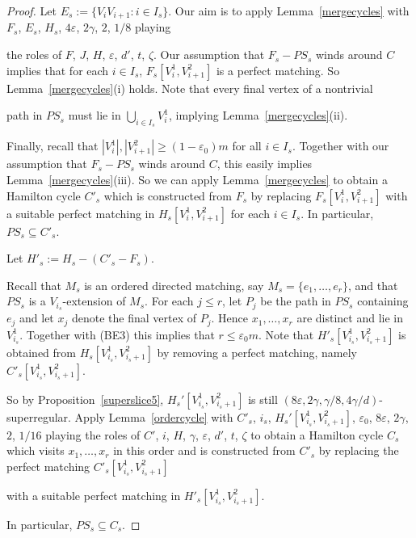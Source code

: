 \documentclass{memo-l}
\def\COMMENT#1{}
\def\eps{\varepsilon}
\numberwithin{section}{chapter}
\numberwithin{equation}{section}
\numberwithin{firstthm}{section}
\numberwithin{figure}{section}
\begin{document}
{\begin{proof}
Let $E_s := \{V_iV_{i+1} : i \in I_s \}$.
Our aim is to apply Lemma~\ref{mergecycles} with $F_s$, $E_s$, $H_s$, $4 \eps$, $2\gamma$, $2$, $1/8$
playing%
    \COMMENT{Need $1/8$ instead of $1/4$ since the density is $2\gamma$}
the roles of $F$, $J$, $H$, $\eps$, $d'$, $t$, $\zeta$.
Our assumption that $F_s- PS_s$ winds around $C$ implies that for each $i\in I_s$, $F_s[V_i^1,V_{i+1}^2]$ is a perfect matching.
So Lemma~\ref{mergecycles}(i) holds. Note that every final vertex of a nontrivial%
    \COMMENT{Daniela: added nontrivial}
path in $PS_s$ must lie in $\bigcup_{i \in I_s} V_i^1$,
implying Lemma~\ref{mergecycles}(ii).%
   \COMMENT{This implies Lemma~\ref{mergecycles}(ii) for cycles $D$ of $F$ which contain some nontrivial path in $PS_s$. The other cycles of $F$
must wind around $C$ and so satisfy Lemma~\ref{mergecycles}(ii) as well.}
Finally, recall that $|V_i^1|, |V_{i+1}^2| \ge (1- \eps_0) m$ for all $i \in I_s$.
Together with our assumption that $F_s - PS_s$ winds around $C$, this easily implies Lemma~\ref{mergecycles}(iii).
So we can apply Lemma~\ref{mergecycles} to obtain a Hamilton cycle $C'_s$ which is constructed from $F_s$ by replacing
$F_s[V^1_i,V^2_{i+1}]$ with a suitable perfect matching in $H_s[V^1_i,V^2_{i+1}]$ for each $i\in I_s$. In particular,
$PS_s\subseteq C'_s$.

Let $H'_s:=H_s - (C'_{s} -F_{s})$.%
	\COMMENT{Allan: had $H'_s:=H_s-C'_{s}$}
Recall that $M_s$ is an ordered directed matching, say $M_s = \{ e_1, \dots, e_r\}$, and that $PS_s$ is a $V_{i_s}$-extension of $M_s$.
For each $j \le r$, let $P_j$ be the path in $PS_s$ containing $e_j$
and let $x_j$ denote the final vertex of $P_j$. Hence $x_1, \dots, x_r$ are distinct and lie in $V_{i_s}^1$.
Together with (BE3) this implies that $r \le \eps_0 m$.
Note that $H'_s [ V_{i_s}^1,V_{i_s+1}^2]$ is obtained from $H_s[ V_{i_s}^1,V_{i_s+1}^2 ]$ by removing a perfect matching, namely $C'_{s}[V_{i_s}^1, V_{i_s+1}^2]$.%
	\COMMENT{Allan: added $C'_{s}[V_{i_s}^1, V_{i_s+1}^2]$ since Lemma~\ref{ordercycle} needs $C'_{s}[V_{i_s}^1, V_{i_s+1}^2]$ is a perfect matching.}
So by Proposition~\ref{superslice5}, $H_s' [V_{i_s}^1, V_{i_s+1}^2]$ is still $(8\eps,2\gamma ,\gamma/8 , 4\gamma/d)$-superregular.
Apply Lemma~\ref{ordercycle} with
$C'_s$, $i_s$, $H_s'[V^1_{i_s}, V^2_{i_s+1}]$, $\eps_0$, $8\eps$, $2\gamma$, $2$, $1/16$ playing the roles of
$C'$, $i$, $H$, $\gamma$, $\eps$, $d'$, $t$, $\zeta$ to obtain a Hamilton cycle $C_s$ which visits $x_1,\dots, x_r$ in this order
and is constructed from $C'_s$ by replacing the perfect matching $C'_s[V_{i_s}^1,V_{i_s+1}^2]$%
    \COMMENT{Daniela: previously had $C'[V_{i_s},V_{i_s+1}]$}
with a suitable perfect matching in $H'_s[V_{i_s}^1,V_{i_s+1}^2]$.%
    \COMMENT{Daniela: previously had $H'_s[V_{i_s},V_{i_s+1}]$}
In particular, $PS_s\subseteq C_s$.


\end{proof}}
\end{document}
